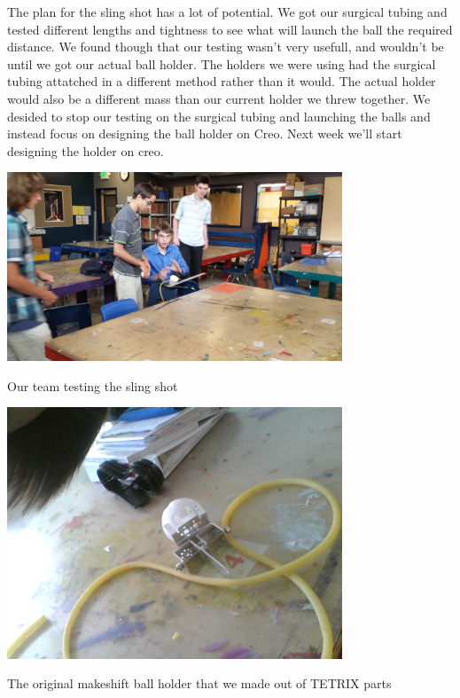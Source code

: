 The plan for the sling shot has a lot of potential. We got our surgical tubing and tested different lengths and tightness to see what will launch the ball the required distance. We found though that our testing wasn't very usefull, and wouldn't be until we got our actual ball holder. The holders we were using had the surgical tubing attatched in a different method rather than it would. The actual holder would also be a different mass than our current holder we threw together. We desided to stop our testing on the surgical tubing and launching the balls and instead focus on designing the ball holder on Creo. Next week we'll start designing the holder on creo. 

\begin{center}
 \includegraphics[width=10cm]{./Entries/Images/SlingShotTesting.jpg}
 \end{center}

Our team testing the sling shot

\begin{center}
 \includegraphics[width=10cm]{./Entries/Images/BallHolder.jpg}
 \end{center}

The original makeshift ball holder that we made out of TETRIX parts


